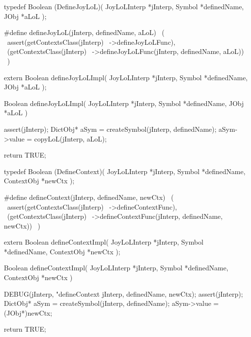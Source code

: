 \startCHeader
typedef Boolean (DefineJoyLoL)(
  JoyLoLInterp *jInterp,
  Symbol       *definedName,
  JObj     *aLoL
);

#define defineJoyLoL(jInterp, definedName, aLoL)      \
  (                                                   \
    assert(getContextsClass(jInterp)                  \
      ->defineJoyLoLFunc),                            \
    (getContextsClass(jInterp)                        \
      ->defineJoyLoLFunc(jInterp, definedName, aLoL)) \
  )
\stopCHeader

\setCHeaderStream{private}
\startCHeader
extern Boolean defineJoyLoLImpl(
  JoyLoLInterp *jInterp,
  Symbol       *definedName,
  JObj     *aLoL
);
\stopCHeader
\setCHeaderStream{public}

\startCCode
Boolean defineJoyLoLImpl(
  JoyLoLInterp *jInterp,
  Symbol       *definedName,
  JObj     *aLoL
) {
  assert(jInterp);
  DictObj* aSym =
    createSymbol(jInterp, definedName);
  aSym->value = copyLoL(jInterp, aLoL);

  return TRUE;
}
\stopCCode

\startCHeader
typedef Boolean (DefineContext)(
  JoyLoLInterp *jInterp,
  Symbol       *definedName,
  ContextObj   *newCtx
);

#define defineContext(jInterp, definedName, newCtx)       \
  (                                                       \
    assert(getContextsClass(jInterp)                      \
      ->defineContextFunc),                               \
    (getContextsClass(jInterp)                            \
      ->defineContextFunc(jInterp, definedName, newCtx))  \
  )
\stopCHeader

\startCHeader
extern Boolean defineContextImpl(
  JoyLoLInterp *jInterp,
  Symbol       *definedName,
  ContextObj   *newCtx
);
\stopCHeader
\setCHeaderStream{public}

\startCCode
Boolean defineContextImpl(
  JoyLoLInterp *jInterp,
  Symbol       *definedName,
  ContextObj   *newCtx
) {
  DEBUG(jInterp, "defineContext %
        jInterp, definedName, newCtx);
  assert(jInterp);
  DictObj* aSym =
    createSymbol(jInterp, definedName);
  aSym->value   = (JObj*)newCtx;

  return TRUE;
}
\stopCCode
